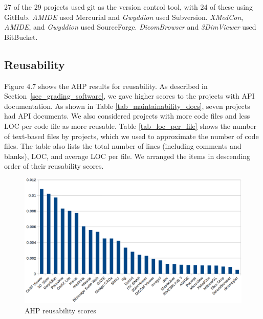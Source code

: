 \documentclass[final, 3p, times, authoryear]{elsarticle}
\begin{document}
27 of the 29 projects used git as the version control tool, with 24 of these
using GitHub. \textit{AMIDE} used Mercurial and \textit{Gwyddion} used
Subversion. \textit{XMedCon}, \textit{AMIDE}, and \textit{Gwyddion} used
SourceForge. \textit{DicomBrowser} and \textit{3DimViewer} used BitBucket. 

\subsection{Reusability} \label{sec_result_reusability}

Figure 4.7 shows the AHP results for reusability. As described in
Section~\ref{sec_grading_software}, we gave higher scores to the projects with
API documentation. As shown in Table \ref{tab_maintainability_docs}, seven
projects had API documents. We also considered projects with more code files and
less LOC per code file as more reusable. Table \ref{tab_loc_per_file} shows the
number of text-based files by projects, which we used to approximate the number
of code files. The table also lists the total number of lines (including
comments and blanks), LOC, and average LOC per file. We arranged the items in
descending order of their reusability scores.

\begin{figure}[!ht]
\includegraphics[scale=0.38]{figures/reusability_scores.png}
\caption{AHP reusability scores}
\label{fg_reusability_scores}
\end{figure}
\end{document}
